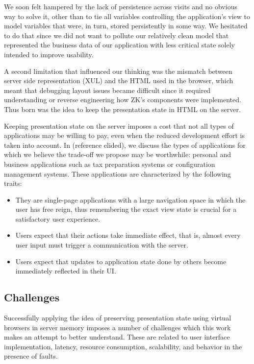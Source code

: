 We soon felt hampered by the lack of persistence across visits and no obvious way 
to solve it, other than to tie all variables controlling the application's
view to model variables that were, in turn, stored persistently in some way.
We hesitated to do that since we did not want to pollute our relatively clean
model that represented the business data of our application with less 
critical state solely intended to improve usability.

A second limitation that influenced our thinking was the mismatch between
server side representation (XUL) and the HTML used in the browser, which meant
that debugging layout issues became difficult since it required understanding
or reverse engineering how ZK's components were implemented.
Thus born was the idea to keep the presentation state in HTML on the server.

Keeping presentation state on the server imposes a cost that not all
types of applications may be willing to pay, even when the reduced development
effort is taken into account.  In (reference elided), we 
discuss the types of applications for which we believe the trade-off we propose
may be worthwhile: personal and business applications such as tax preparation systems
or configuration management systems.  These applications are characterized by the following
traits:
\begin{itemize}
\item They are single-page applications with a large navigation space in which the
    user has free reign, thus remembering the exact view state is crucial for
    a satisfactory user experience.
\item Users expect that their actions take immediate effect, that is, almost every
    user input must trigger a communication with the server.
\item Users expect that updates to application state done by others become immediately
    reflected in their UI.
\end{itemize}

\architectureoverview{}

\subsection{Challenges}
\webscaleout{}
Successfully applying the idea of preserving presentation state using virtual
browsers in server memory imposes a number of challenges which this work 
makes an attempt to better understand.
These are related to user interface implementation, latency, 
resource consumption, scalability, and behavior in the presence of faults.

